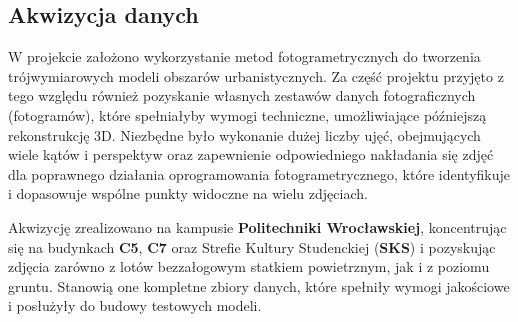 \subsection{Akwizycja danych}
W projekcie założono wykorzystanie metod fotogrametrycznych do tworzenia trójwymiarowych modeli 
obszarów urbanistycznych. Za część projektu przyjęto z tego względu również pozyskanie własnych zestawów 
danych fotograficznych (fotogramów), które spełniałyby wymogi techniczne, umożliwiające późniejszą 
rekonstrukcję 3D. Niezbędne było wykonanie dużej liczby ujęć, obejmujących wiele kątów i perspektyw oraz 
zapewnienie odpowiedniego nakładania się zdjęć dla poprawnego działania oprogramowania fotogrametrycznego, 
które identyfikuje i dopasowuje wspólne punkty widoczne na wielu zdjęciach.

Akwizycję zrealizowano na kampusie \textbf{Politechniki Wrocławskiej}, koncentrując się na budynkach \textbf{C5}, \textbf{C7} oraz 
Strefie Kultury Studenckiej (\textbf{SKS}) i pozyskując zdjęcia zarówno z lotów bezzałogowym statkiem powietrznym, 
jak i z poziomu gruntu. Stanowią one kompletne zbiory danych, które spełniły wymogi jakościowe 
i posłużyły do budowy testowych modeli. 

